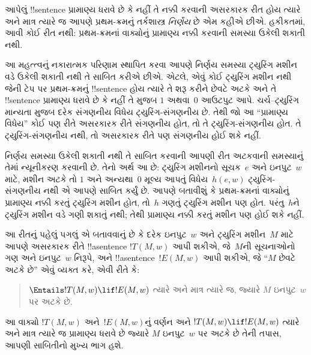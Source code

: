 \documentclass[../../../include/open-logic-section]{subfiles}
\begin{document}

આપેલું !!{sentence} પ્રામાણ્ય ધરાવે છે કે નહીં તે
નક્કી કરવાની અસરકારક રીત હોય ત્યારે અને માત્ર ત્યારે
જ આપણે પ્રથમ-ક્રમનું તર્કશાસ્ત્ર \emph{નિર્ણેય} છે એમ
કહીએ છીએ. હકીકતમાં, આવી કોઈ રીત નથી: પ્રથમ-ક્રમનાં
વાક્યોનું પ્રામાણ્ય નક્કી કરવાની સમસ્યા ઉકેલી શકાતી નથી.

આ મહત્ત્વનું નકારાત્મક પરિણામ સ્થાપિત કરવા આપણે
નિર્ણય સમસ્યા ટ્યુરિંગ મશીન વડે ઉકેલી શકાતી નથી તે
સાબિત કરીએ છીએ. એટલે, એવું કોઈ ટ્યુરિંગ મશીન નથી
જેની ટેપ પર પ્રથમ-ક્રમનું !!{sentence} હોય ત્યારે
તે શરૂ કરીને છેવટે અટકે અને તે !!{sentence} પ્રામાણ્ય ધરાવે
છે કે નહીં તે મુજબ $1$ અથવા~$0$ આઉટપુટ આપે.
ચર્ચ--ટ્યુરિંગ માન્યતા મુજબ દરેક સંગણનીય વિધેય
ટ્યુરિંગ-સંગણનીય છે. તેથી જો આ ``પ્રામાણ્ય વિધેય''
કોઈ પણ રીતે અસરકારક રીતે સંગણનીય હોત, તો તે
ટ્યુરિંગ-સંગણનીય હોત. તે ટ્યુરિંગ-સંગણનીય નથી,
તો અસરકારક રીતે પણ સંગણનીય હોઈ શકે નહીં.

નિર્ણય સમસ્યા ઉકેલી શકાતી નથી તે સાબિત કરવાની
આપણી રીત અટકવાની સમસ્યાનું તેમાં ન્યૂનીકરણ કરવાની
છે. તેનો અર્થ આ છે: ટ્યુરિંગ મશીનનો સૂચક~$e$
અને ઇનપુટ~$w$ માટે, મશીન અટકે તો $1$ અને
અન્યથા~$0$ મૂલ્ય આપતું વિધેય~$h(e,w)$ ટ્યુરિંગ-સંગણનીય
નથી એ આપણે સાબિત કર્યું છે. આપણે બતાવીશું કે
પ્રથમ-ક્રમનાં વાક્યોનું પ્રામાણ્ય નક્કી કરતું ટ્યુરિંગ
મશીન હોત, તો~$h$ ગણતું ટ્યુરિંગ મશીન પણ હોત.
પરંતુ~$h$ને ટ્યુરિંગ મશીન વડે ગણી શકાતું નથી;
તેથી પ્રામાણ્ય નક્કી કરતું મશીન પણ હોઈ શકે નહીં.

આ રીતનું પહેલું પગલું એ બતાવવાનું છે કે દરેક ઇનપુટ~$w$
અને ટ્યુરિંગ મશીન~$M$ માટે આપણે અસરકારક રીતે
!!a{sentence} $!T(M, w)$ આપી શકીએ, જે~$M$ની
સૂચનાઓનો ગણ અને ઇનપુટ~$w$ નિરૂપે, અને
!!a{sentence}~$!E(M, w)$ આપી શકીએ, જે ``$M$ છેવટે
અટકે છે'' એવું વ્યક્ત કરે, એવી રીતે કે:
\begin{quote}
  $\Entails !T(M, w) \lif !E(M,w)$ ત્યારે અને માત્ર
  ત્યારે જ, જ્યારે $M$ ઇનપુટ~$w$ પર અટકે છે.
\end{quote}
આ વાક્યો $!T(M, w)$ અને~$!E(M, w)$નું વર્ણન અને
$!T(M, w) \lif !E(M, w)$ ત્યારે અને માત્ર ત્યારે જ
પ્રામાણ્ય ધરાવે છે જ્યારે $M$ ઇનપુટ~$w$ પર અટકે
છે તેની તપાસ, આપણી સાબિતીનો મુખ્ય ભાગ હશે.
\end{document}
